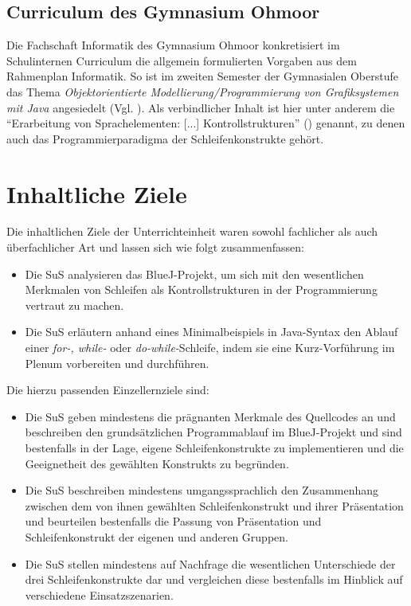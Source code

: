 \documentclass[paper=a4, DIV=13, BCOR=12mm, twoside=on, onecolumn=on, open = any, titlepage =on, parskip =half-, headsepline = on, footsepline = on, chapterprefix = on, sectionprefix = on, appendixprefix = off, fontsize = 11pt, numbers = noenddot, abstract = off]{scrreprt}
\begin{document}
\subsection{Curriculum des Gymnasium Ohmoor}
\onehalfspacing
Die Fachschaft Informatik des Gymnasium Ohmoor konkretisiert im Schulinternen Curriculum die allgemein formulierten Vorgaben aus dem Rahmenplan Informatik. So ist im zweiten Semester der Gymnasialen Oberstufe das Thema \textit{Objektorientierte Modellierung/Programmierung von Grafiksystemen mit Java} angesiedelt (Vgl. \cite[S.6f.]{ohmoor:16}). Als verbindlicher Inhalt ist hier unter anderem die "`Erarbeitung von Sprachelementen: [...] Kontrollstrukturen"' (\cite[S.7]{ohmoor:16}) genannt, zu denen auch das Programmierparadigma der Schleifenkonstrukte gehört.

\par \singlespacing
 \section{Inhaltliche Ziele}
\onehalfspacing
Die inhaltlichen Ziele der Unterrichteinheit waren sowohl fachlicher als auch überfachlicher Art und lassen sich wie folgt zusammenfassen:
\begin{itemize}
\item Die SuS analysieren das BlueJ-Projekt, um sich mit den wesentlichen Merkmalen von Schleifen als Kontrollstrukturen in der Programmierung vertraut zu machen.
\item Die SuS erläutern anhand eines Minimalbeispiels in Java-Syntax den Ablauf einer \emph{for-, while-} oder \emph{do-while-}Schleife, indem sie eine Kurz-Vorführung im Plenum vorbereiten und durchführen.
\end{itemize}
Die hierzu passenden Einzellernziele sind:
\begin{itemize}
\item Die SuS geben mindestens die prägnanten Merkmale des Quellcodes an und beschreiben den grundsätzlichen Programmablauf im BlueJ-Projekt und sind bestenfalls in der Lage, eigene Schleifenkonstrukte zu implementieren und die Geeignetheit des gewählten Konstrukts zu begründen.
\item Die SuS beschreiben mindestens umgangssprachlich den Zusammenhang zwischen dem von ihnen gewählten Schleifenkonstrukt und ihrer Präsentation und beurteilen bestenfalls die Passung von Präsentation und Schleifenkonstrukt der eigenen und anderen Gruppen.
\item Die SuS stellen mindestens auf Nachfrage die wesentlichen Unterschiede der drei Schleifenkonstrukte dar und vergleichen diese bestenfalls im Hinblick auf verschiedene Einsatzszenarien.
\end{itemize}
\end{document}
